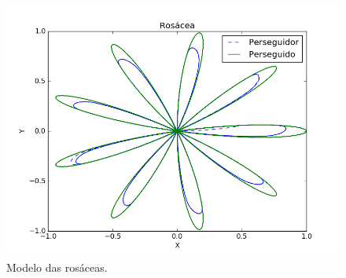 \documentclass[a4paper,10pt]{article}
\begin{document}
  \begin{figure}[H]
   \includegraphics[width=\textwidth]{rosacea.png}
   \caption{Modelo das rosáceas.}
   \label{fig:rosacea}
  \end{figure}
  
\end{document}
